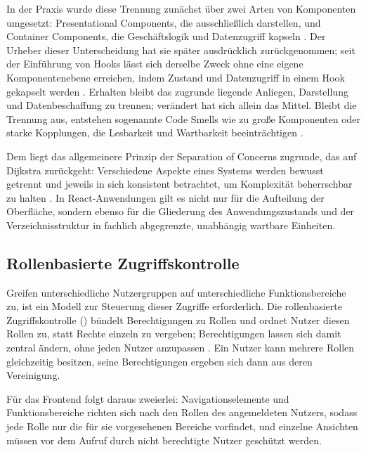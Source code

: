 In der Praxis wurde diese Trennung zunächst über zwei Arten von
Komponenten umgesetzt: Presentational Components, die ausschließlich
darstellen, und Container Components, die Geschäftslogik und
Datenzugriff kapseln \cite{abramov_presentational_container}. Der
Urheber dieser Unterscheidung hat sie später ausdrücklich
zurückgenommen; seit der Einführung von Hooks lässt sich derselbe
Zweck ohne eine eigene Komponentenebene erreichen, indem Zustand und
Datenzugriff in einem Hook gekapselt werden
\cite{abramov_presentational_container}. Erhalten bleibt das
zugrunde liegende Anliegen, Darstellung und Datenbeschaffung zu
trennen; verändert hat sich allein das Mittel. Bleibt die Trennung
aus, entstehen sogenannte Code Smells wie zu große Komponenten oder
starke Kopplungen, die Lesbarkeit und Wartbarkeit beeinträchtigen
\cite{ferreira_react_smells}.

Dem liegt das allgemeinere Prinzip der Separation of Concerns
zugrunde, das auf Dijkstra zurückgeht: Verschiedene Aspekte eines
Systems werden bewusst getrennt und jeweils in sich konsistent
betrachtet, um Komplexität beherrschbar zu halten
\cite{dijkstra_separation_of_concerns}. In React-Anwendungen gilt es
nicht nur für die Aufteilung der Oberfläche, sondern ebenso für die
Gliederung des Anwendungszustands und der Verzeichnisstruktur in
fachlich abgegrenzte, unabhängig wartbare Einheiten.



\subsection{Rollenbasierte Zugriffskontrolle}
\label{subsec:rbac}

Greifen unterschiedliche Nutzergruppen auf unterschiedliche
Funktionsbereiche zu, ist ein Modell zur Steuerung dieser Zugriffe
erforderlich. Die rollenbasierte Zugriffskontrolle ()
bündelt Berechtigungen zu Rollen und ordnet Nutzer diesen Rollen zu,
statt Rechte einzeln zu vergeben; Berechtigungen lassen sich damit
zentral ändern, ohne jeden Nutzer anzupassen
\cite{ferraiolo_rbac_arxiv}. Ein Nutzer kann mehrere Rollen
gleichzeitig besitzen, seine Berechtigungen ergeben sich dann aus
deren Vereinigung.

Für das Frontend folgt daraus zweierlei: Navigationselemente und
Funktionsbereiche richten sich nach den Rollen des angemeldeten
Nutzers, sodass jede Rolle nur die für sie vorgesehenen Bereiche
vorfindet, und einzelne Ansichten müssen vor dem Aufruf durch nicht
berechtigte Nutzer geschützt werden.

